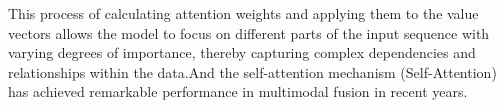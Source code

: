 This process of calculating attention weights and applying them to the value vectors allows the model to focus on different parts of the input sequence with varying degrees of importance, thereby capturing complex dependencies and relationships within the data.And the self-attention mechanism (Self-Attention) has achieved remarkable performance in multimodal fusion in recent years.



\newpage